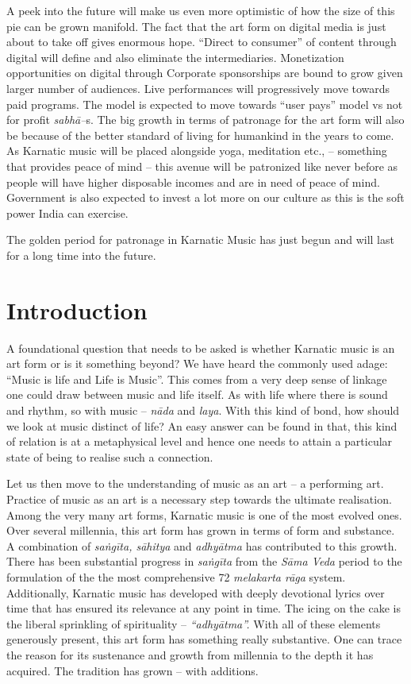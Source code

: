 A peek into the future will make us even more optimistic of how the size of this pie can be grown manifold. The fact that the art form on digital media is just about to take off gives enormous hope. “Direct to consumer” of content through digital will define and also eliminate the intermediaries. Monetization opportunities on digital through Corporate sponsorships are bound to grow given larger number of audiences. Live performances will progressively move towards paid programs. The model is expected to move towards “user pays” model vs not for profit \textit{sabhā–}s. The big growth in terms of patronage for the art form will also be because of the better standard of living for humankind in the years to come. As Karnatic music will be placed alongside yoga, meditation etc., – something that provides peace of mind – this avenue will be patronized like never before as people will have higher disposable incomes and are in need of peace of mind. Government is also expected to invest a lot more on our culture as this is the soft power India can exercise.

The golden period for patronage in Karnatic Music has just begun and will last for a long time into the future.


\section*{Introduction}

A foundational question that needs to be asked is whether Karnatic music is an art form or is it something beyond? We have heard the commonly used adage: “Music is life and Life is Music”. This comes from a very deep sense of linkage one could draw between music and life itself. As with life where there is sound and rhythm\textit{,} so with music – \textit{nāda} and \textit{laya}. With this kind of bond, how should we look at music distinct of life? An easy answer can be found in that, this kind of relation is at a metaphysical level and hence one needs to attain a particular state of being to realise such a connection.

Let us then move to the understanding of music as an art – a performing art. Practice of music as an art is a necessary step towards the ultimate realisation. Among the very many art forms, Karnatic music is one of the most evolved ones. Over several millennia, this art form has grown in terms of form and substance. A combination of \textit{saṅgīta, sāhitya} and \textit{adhyātma} has contributed to this growth. There has been substantial progress in \textit{saṅgīta} from the \textit{Sāma Veda} period to the formulation of the the most comprehensive 72 \textit{melakarta rāga} system. Additionally, Karnatic music has developed with deeply devotional lyrics over time that has ensured its relevance at any point in time. The icing on the cake is the liberal sprinkling of spirituality – \textit{“adhyātma”.} With all of these elements generously present, this art form has something really substantive. One can trace the reason for its sustenance and growth from millennia to the depth it has acquired. The tradition has grown – with additions.

